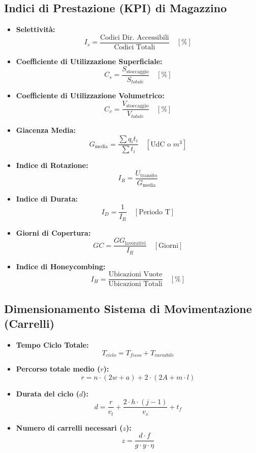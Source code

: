\subsection*{Indici di Prestazione (KPI) di Magazzino}
\begin{itemize}
    \item \textbf{Selettività:}
          \[
              I_{s} = \frac{\text{Codici Dir. Accessibili}}{\text{Codici Totali}} \quad [\%]
          \]

    \item \textbf{Coefficiente di Utilizzazione Superficiale:}
          \[
              C_{s} = \frac{S_{\text{stoccaggio}}}{S_{totale}} \quad [\%]
          \]

    \item \textbf{Coefficiente di Utilizzazione Volumetrico:}
          \[
              C_{v} = \frac{V_{\text{stoccaggio}}}{V_{totale}} \quad [\%]
          \]

    \item \textbf{Giacenza Media:}
          \[
              G_{\text{media}} = \frac{\sum q_{i}t_{i}}{\sum t_{i}} \quad [\text{UdC} \text{ o } m^3]
          \]

    \item \textbf{Indice di Rotazione:}
          \[
              I_{R} = \frac{U_{\text{transito}}}{G_{\text{media}}}
          \]

    \item \textbf{Indice di Durata:}
          \[
              I_{D} = \frac{1}{I_{R}} \quad [\text{Periodo T}]
          \]

    \item \textbf{Giorni di Copertura:}
          \[
              GC = \frac{GG_{\text{lavorativi}}}{I_{R}} \quad [\text{Giorni}]
          \]

    \item \textbf{Indice di Honeycombing:}
          \[
              I_{H} = \frac{\text{Ubicazioni Vuote}}{\text{Ubicazioni Totali}} \quad [\%]
          \]
\end{itemize}

\subsection*{Dimensionamento Sistema di Movimentazione (Carrelli)}
\begin{itemize}
    \item \textbf{Tempo Ciclo Totale:}
          \[
              T_{ciclo} = T_{fisso} + T_{variabile}
          \]

    \item \textbf{Percorso totale medio ($r$):}
          \[
              r = n \cdot (2w+a)+ 2 \cdot (2A+m \cdot l)
          \]

    \item \textbf{Durata del ciclo ($d$):}
          \[
              d = \frac{r}{v_{t}} + \frac{2 \cdot h \cdot (j-1)}{v_{s}} + t_{f}
          \]

    \item \textbf{Numero di carrelli necessari ($z$):}
          \[
              z = \frac{d \cdot f}{g \cdot y \cdot \eta}
          \]
\end{itemize}

